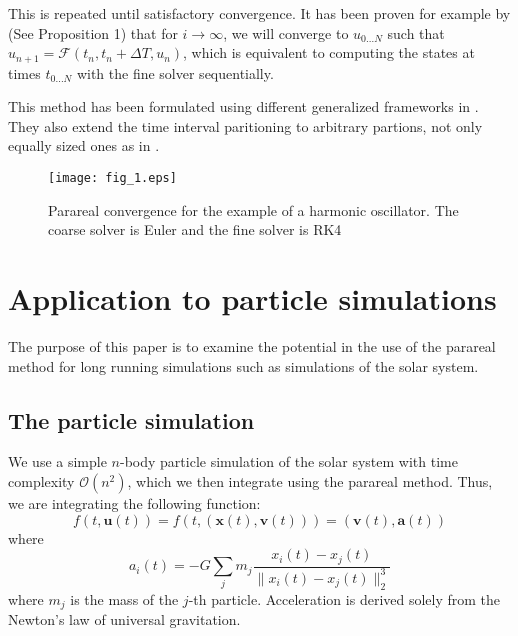 \documentclass[conference]{IEEEtran}
\begin{document}
This is repeated until satisfactory convergence. It has been proven for example by \cite{parareal} (See Proposition 1) that for $i \to \infty$, we will converge to $u_{0\dots N}$ such that $u_{n+1} = \mathcal{F}(t_n, t_n+\Delta T, u_n)$, which is equivalent to computing the states at times $t_{0\dots N}$ with the fine solver sequentially.

This method has been formulated using different generalized frameworks in \cite{parareal2}. They also extend the time interval paritioning to arbitrary partions, not only equally sized ones as in \cite{parareal}.

\begin{figure}[htbp]
\centerline{\texttt{[image: fig\_1.eps]}}
\caption{Parareal convergence for the example of a harmonic oscillator. The coarse solver is Euler and the fine solver is RK4}
\label{oscillator}
\end{figure}

\section{Application to particle simulations}
The purpose of this paper is to examine the potential in the use of the parareal method for long running simulations such as simulations of the solar system. 

\subsection{The particle simulation}
We use a simple $n$-body particle simulation of the solar system with time complexity $\mathcal{O}(n^2)$, which we then integrate using the parareal method. Thus, we are integrating the following function:
$$
f(t, \mathbf{u}(t)) = f(t, (\mathbf{x}(t), \mathbf{v}(t))) = (\mathbf{v}(t), \mathbf{a}(t))
$$
where 
$$
a_i(t) = -G \sum_j m_j\frac{x_i(t)-x_j(t)}{\|x_i(t)-x_j(t)\|_2^3}
$$
where $m_j$ is the mass of the $j$-th particle. Acceleration is derived solely from the Newton's law of universal gravitation.
\end{document}
